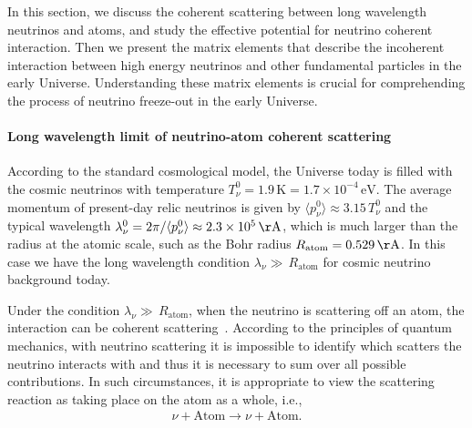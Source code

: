 In this section, we discuss the coherent scattering between long wavelength neutrinos and atoms, and study the effective potential for neutrino coherent interaction. Then we present the matrix elements that describe the incoherent interaction between high energy neutrinos and other fundamental particles in the early Universe. Understanding these matrix elements is crucial for comprehending the process of neutrino freeze-out in the early Universe.

\paragraph{Long wavelength limit of neutrino-atom coherent scattering}
According to the standard cosmological model, the Universe today is filled with the cosmic neutrinos with temperature $T_{\nu}^0=1.9 \,\mathrm{K}=1.7\times10^{-4}\,\mathrm{eV}$.
The average momentum of present-day relic neutrinos is given by $\langle p_\nu^0\rangle\approx3.15\,T_\nu^0$ and the typical wavelength $\lambda_\nu^0={2\pi}/{\langle p_\nu^0\rangle}\approx2.3\times10^5\,\mathrm{\AA}$, which is much larger than the radius at the atomic scale, such as the Bohr radius $R_{\mathrm{atom}}=0.529\,\mathrm{\AA}$. In this case we have the long wavelength condition $\lambda_\nu\gg\,R_{\mathrm{atom}}$ for cosmic neutrino background today.  

Under the condition $\lambda_\nu\gg\,R_{\mathrm{atom}}$, when the neutrino is scattering off an atom, the interaction can be coherent scattering~\cite{PhysRevD.38.32,Lewis:1979mu,Papavassiliou:2005cs}. According to the principles of quantum mechanics, with neutrino scattering it is impossible to identify which scatters the neutrino interacts with and thus it is necessary to sum over all possible contributions. In such circumstances, it is appropriate to view the scattering reaction as taking place on the atom as a whole, i.e.,
\begin{align}
\nu+\mathrm{Atom}\longrightarrow\nu+\mathrm{Atom}.
\end{align}

